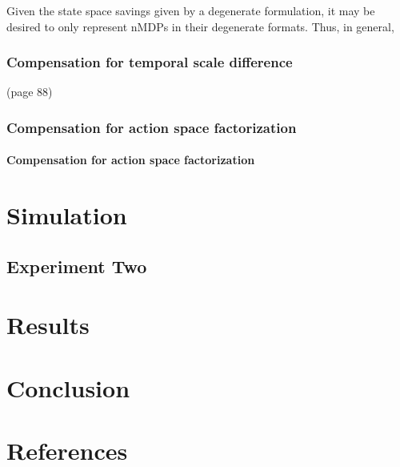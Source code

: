 \documentclass[compsoc,journal,letterpaper,10pt,draftcls,twocolumn]{IEEEtran}
\begin{document}
Given the state space savings given by a degenerate formulation, it may
be desired to only represent nMDPs in their degenerate formats. Thus, in
general,

\subsubsection{Compensation for temporal scale
difference}\label{compensation-for-temporal-scale-difference}

(page 88)

\subsubsection{Compensation for action space
factorization}\label{compensation-for-action-space-factorization}

\paragraph{Compensation for action space
factorization}\label{compensation-for-action-space-factorization-1}

\section{}\label{section-1}

\section{Simulation}\label{simulation-1}

\subsection{Experiment Two}\label{experiment-two}

\section{Results}\label{results}

\section{Conclusion}\label{conclusion}

\section{References}\label{references}
\end{document}
